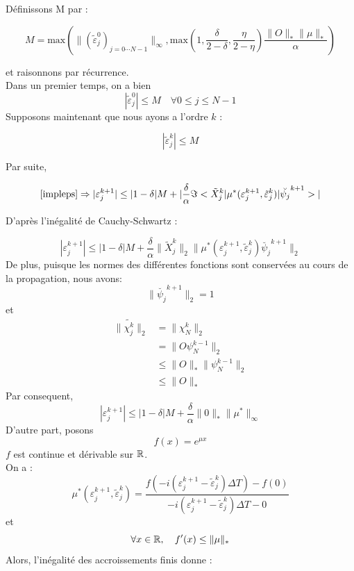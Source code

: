 \begin{ proof }
	Définissons M par :
	
	\begin{equation} \label{M}
	M = \text{max}(\lVert (\tilde{\varepsilon}_j^0)_{j=0\cdots N-1}\lVert_{\infty}, \text{max}(1,\frac{\delta}{2-\delta}, \frac{\eta}{2-\eta})\frac{\lVert O \rVert_* \lVert \mu \rVert_* }{\alpha} )
	\end{equation}
	
	et raisonnons par récurrence.\\
	Dans un premier temps, on a bien
	$$
	|\tilde{\varepsilon}_j^0| \leq M \quad \forall 0 \leq j \leq N-1
	$$
	Supposons maintenant que nous ayons a l'ordre $k$ :
	
	$$ |\tilde{\varepsilon}_j^k| \leq M $$
	
	Par suite,
	
	$$
	\eqref{impleps} \Rightarrow |\varepsilon_j^{k+1}| \leq |1-\delta|M + |\frac{\delta}{\alpha} \Im < \tilde{X}^k_j| \mu^* ( \varepsilon_j^{k+1}, \tilde{\varepsilon}_j^k)| \breve{\psi_j}^{k+1} >|
	$$
	
	D’après l'inégalité de Cauchy-Schwartz :
	
	$$
	|\varepsilon_j^{k+1}| \leq |1-\delta|M + \frac{\delta}{\alpha} \lVert \tilde{X}^k_j\rVert_2 \lVert \mu^* ( \varepsilon_j^{k+1}, \tilde{\varepsilon}_j^k) \breve{\psi_j}^{k+1} \rVert_2
	$$
	De plus, puisque les normes des différentes fonctions sont conservées au cours de la propagation, nous avons:
	$$
	\lVert \breve{\psi_j}^{k+1} \rVert_2 = 1 
	$$
	et
	\begin{align*}
	\lVert \tilde{\chi^k_j} \rVert_2 &= \lVert \chi^k_N \rVert_2\\
	 &= \lVert O \psi_N^{k-1}\rVert_2 \\
	 &\leq \lVert O \rVert_* \lVert \psi_N^{k-1}\rVert_2 \\
	 &\leq \lVert O \rVert_*
	\end{align*}
	Par consequent,
	$$
	|\varepsilon_j^{k+1}| \leq |1-\delta|M + \frac{\delta}{\alpha} \lVert 0 \rVert_* \lVert \mu^* \rVert_{\infty}
	$$
	D’autre part, posons
	$$
	f(x)=e^{\mu x}
	$$
	$f$ est continue et dérivable sur $\mathbb R$.\\
	On a :
	$$
	\mu^* (\varepsilon_j^{k+1}, \tilde{\varepsilon}_j^k)= \dfrac{f(-i (\varepsilon_j^{k+1}- \tilde{\varepsilon}_j^k)\Delta T) - f(0)}{-i (\varepsilon_j^{k+1}- \tilde{\varepsilon}_j^k)\Delta T-0}
	$$
	et
	$$
	\forall x \in \mathbb R, \quad f'(x) \leq \lVert \mu \rVert_*
	$$
	Alors, l'inégalité des accroissements finis donne :
	

\end{ proof }
